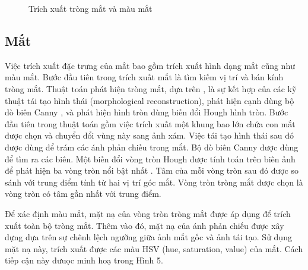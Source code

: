 \documentclass[journal]{IEEEtran}
\begin{document}
\begin{figure}[!t]
\caption{Trích xuất tròng mắt và màu mắt}
\label{refhinh5}
\end{figure}

\subsection{Mắt}

Việc trích xuất đặc trưng của mắt bao gồm trích xuất hình dạng mắt cũng như màu mắt. Bước đầu tiên trong trích xuất mắt là tìm kiếm vị trí và bán kính tròng mắt. Thuật toán phát hiện tròng mắt, dựa trên \cite{ref:r4}, là sự kết hợp của các kỹ thuật tái tạo hình thái (morphological reconstruction), phát hiện cạnh dùng bộ dò biên Canny \cite{ref:r6}, và phát hiện hình tròn dùng biến đổi Hough hình tròn. Bước đầu tiên trong thuật toán gồm việc trích xuất một khung bao lớn chứa con mắt được chọn và chuyển đổi vùng này sang ảnh xám. Việc tái tạo hình thái sau đó được dùng để trám các ánh phản chiếu trong mắt. Bộ dò biên Canny được dùng để tìm ra các biên. Một biến đổi vòng tròn Hough được tính toán trên biên ảnh để phát hiện ba vòng tròn nổi bật nhất \cite{ref:r7}. Tâm của mỗi vòng tròn sau đó được so sánh với trung điểm tính từ hai vị trí góc mắt. Vòng tròn tròng mắt được chọn là vòng tròn có tâm gần nhất với trung điểm.

Để xác định màu mắt, mặt nạ của vòng tròn tròng mắt được áp dụng để trích xuất toàn bộ tròng mắt. Thêm vào đó, mặt nạ của ánh phản chiếu được xây dựng dựa trên sự chênh lệch ngưỡng giữa ảnh mắt gốc và ảnh tái tạo. Sử dụng mặt nạ này, trích xuất được các màu HSV (hue, saturation, value) của mắt. Cách tiếp cận này đưuọc minh hoạ trong Hình 5.
\end{document}
